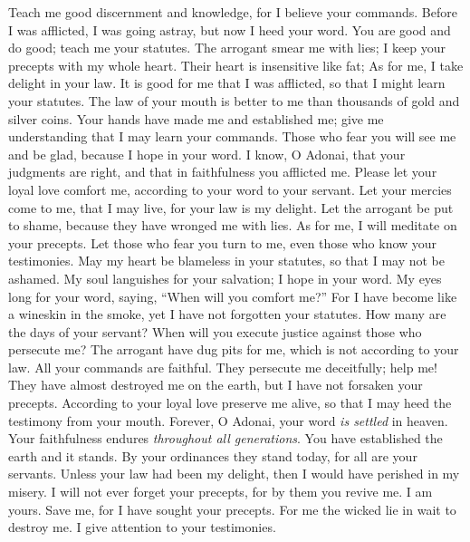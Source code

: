 \begin{biblechapter}
\verse Teach me good discernment and knowledge, 
for I believe your commands.
\verse Before I was afflicted, I was going astray, 
but now I heed your word.
\verse You are good and do good; 
teach me your statutes.
\verse The arrogant smear me with lies; 
I keep your precepts with my whole heart.
\verse Their heart is insensitive like fat; 
As for me, I take delight in your law.
\verse It is good for me that I was afflicted, 
so that I might learn your statutes.
\verse The law of your mouth is better to me 
than thousands of gold and silver coins.
 Your hands have made me and established me; 
give me understanding that I may learn your commands.
\verse Those who fear you will see me and be glad, 
because I hope in your word.
\verse I know, O Adonai, that your judgments are right, 
and that in faithfulness you afflicted me.
\verse Please let your loyal love comfort me, 
according to your word to your servant.
\verse Let your mercies come to me, that I may live, 
for your law is my delight.
\verse Let the arrogant be put to shame, 
because they have wronged me with lies. 
As for me, I will meditate on your precepts.
\verse Let those who fear you turn to me, 
even those who know your testimonies.
\verse May my heart be blameless in your statutes, 
so that I may not be ashamed.
 My soul languishes for your salvation; 
I hope in your word.
\verse My eyes long for your word, 
saying, “When will you comfort me?”
\verse For I have become like a wineskin in the smoke, 
yet I have not forgotten your statutes.
\verse How many are the days of your servant? 
When will you execute justice against those who persecute me?
\verse The arrogant have dug pits for me, 
which is not according to your law.
\verse All your commands are faithful. 
They persecute me deceitfully; help me!
\verse They have almost destroyed me on the earth, 
but I have not forsaken your precepts.
\verse According to your loyal love preserve me alive, 
so that I may heed the testimony from your mouth.
 Forever, O Adonai, 
your word \textit{is settled} in heaven.
\verse Your faithfulness endures \textit{throughout all generations}. 
You have established the earth and it stands.
\verse By your ordinances they stand today, 
for all are your servants.
\verse Unless your law had been my delight, 
then I would have perished in my misery.
\verse I will not ever forget your precepts, 
for by them you revive me.
\verse I am yours. Save me, 
for I have sought your precepts.
\verse For me the wicked lie in wait to destroy me. 
I give attention to your testimonies.

\end{biblechapter}
